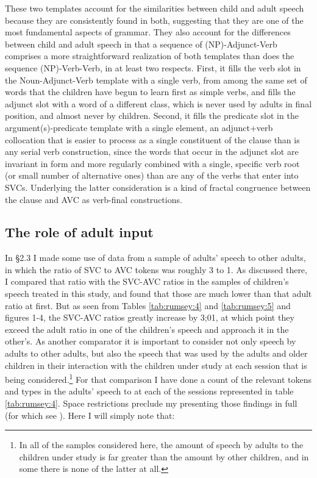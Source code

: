 \documentclass[output=paper]{langsci/langscibook}
\begin{document}
These two templates account for the similarities between child and adult speech because they are consistently found in both, suggesting that they are one of the most fundamental aspects of  grammar. They also account for the differences between child and adult speech in that a sequence of (NP)-Adjunct-Verb comprises a more straightforward realization of both templates than does the sequence (NP)-Verb-Verb, in at least two respects. First, it fills the verb slot in the Noun-Adjunct-Verb template with a single verb, from among the same set of words that the children have begun to learn first as simple verbs, and fills the adjunct slot with a word of a different class, which is never used by adults in final position, and almost never by children.  Second, it fills the predicate slot in the argument(s)-predicate template with a single element, an adjunct+verb collocation that is easier to process as a single constituent of the clause than is any serial verb construction, since the words that occur in the adjunct slot are invariant in form and more regularly combined with a single, specific verb root (or small number of alternative ones) than are any of the verbs that enter into SVCs. Underlying the latter consideration is a kind of fractal congruence between the  clause and AVC as verb-final constructions.   

\subsection{The role of adult input}

In §2.3 I made some use of data from a sample of adults’ speech to other adults, in which the ratio of SVC to AVC tokens was roughly 3 to 1. As discussed there, I compared that ratio with the SVC-AVC ratios in the samples of children’s speech treated in this study, and found that those are much lower than that adult ratio at first. But as seen from Tables \ref{tab:rumsey:4} and \ref{tab:rumsey:5} and figures 1-4, the SVC-AVC ratios greatly increase by 3;01, at which point they exceed the adult ratio in one of the children’s speech and approach it in the other’s. As another comparator it is important to consider not only speech by adults to other adults, but also the speech that was used by the adults and older children in their interaction with the children under study at each session that is being considered.\footnote{In all of the samples considered here, the amount of speech by adults to the children under study is far greater than the amount by other children, and in some there is none of the latter at all.} For that comparison I have done a count of the relevant tokens and types in the adults’ speech to  at each of the sessions represented in table \ref{tab:rumsey:4}. Space restrictions preclude my presenting those findings in full (for which see \citealt{MerlanForthcoming}). Here I will simply note that:
\end{document}
